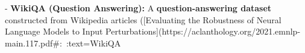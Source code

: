 - \textbf{WikiQA (Question Answering):} A \textbf{question-answering dataset} constructed from Wikipedia articles ([Evaluating the Robustness of Neural Language Models to Input Perturbations](https://aclanthology.org/2021.emnlp-main.117.pdf#:~:text=WikiQA%

